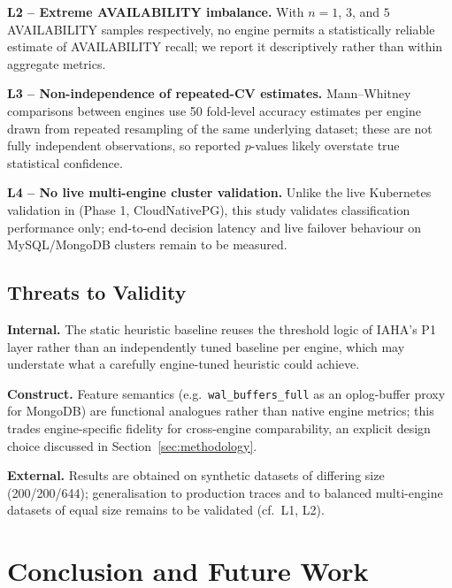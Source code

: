 \documentclass[pdflatex,sn-mathphys-num]{sn-jnl}
\theoremstyle{thmstyleone}
\theoremstyle{thmstylethree}
\begin{document}
\textbf{L2 -- Extreme AVAILABILITY imbalance.} With $n=1$, $3$, and
$5$ AVAILABILITY samples respectively, no engine permits a
statistically reliable estimate of AVAILABILITY recall; we report it
descriptively rather than within aggregate metrics.

\textbf{L3 -- Non-independence of repeated-CV estimates.} Mann--Whitney
comparisons between engines use 50 fold-level accuracy estimates per
engine drawn from repeated resampling of the same underlying dataset;
these are not fully independent observations, so reported $p$-values
likely overstate true statistical confidence.

\textbf{L4 -- No live multi-engine cluster validation.} Unlike
the live Kubernetes validation in \cite{iaha2026} (Phase 1, CloudNativePG),
this study validates classification performance only; end-to-end
decision latency and live failover behaviour on MySQL/MongoDB
clusters remain to be measured.

\subsection{Threats to Validity}\label{subsec:threats}

\textbf{Internal.} The static heuristic baseline reuses the threshold
logic of IAHA's P1 layer rather than an independently tuned baseline
per engine, which may understate what a carefully engine-tuned
heuristic could achieve.

\textbf{Construct.} Feature semantics (e.g.\ \texttt{wal\_buffers\_full}
as an oplog-buffer proxy for MongoDB) are functional analogues rather
than native engine metrics; this trades engine-specific fidelity for
cross-engine comparability, an explicit design choice discussed in
Section~\ref{sec:methodology}.

\textbf{External.} Results are obtained on synthetic datasets of
differing size (200/200/644); generalisation to production traces and
to balanced multi-engine datasets of equal size remains to be
validated (cf.\ L1, L2).

\section{Conclusion and Future Work}\label{sec:conclusion}
\end{document}
